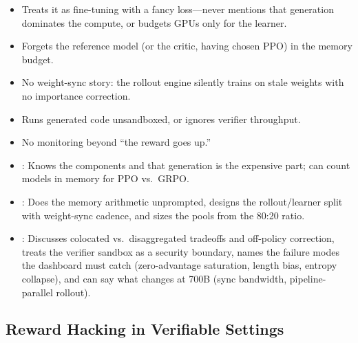 \begin{interviewq}
\redflags
\begin{itemize}
\item Treats it as fine-tuning with a fancy loss---never mentions that
  generation dominates the compute, or budgets GPUs only for the learner.
\item Forgets the reference model (or the critic, having chosen PPO)
  in the memory budget.
\item No weight-sync story: the rollout engine silently trains on stale
  weights with no importance correction.
\item Runs generated code unsandboxed, or ignores verifier throughput.
\item No monitoring beyond ``the reward goes up.''
\end{itemize}


\goodgreat
\begin{itemize}
\item {}: Knows the components and that generation is the
  expensive part; can count models in memory for PPO vs.\ GRPO.
\item {}: Does the memory arithmetic unprompted, designs the
  rollout/learner split with weight-sync cadence, and sizes the pools
  from the 80:20 ratio.
\item {}: Discusses colocated vs.\ disaggregated tradeoffs
  and off-policy correction, treats the verifier sandbox as a security
  boundary, names the failure modes the dashboard must catch
  (zero-advantage saturation, length bias, entropy collapse), and can
  say what changes at 700B (sync bandwidth, pipeline-parallel rollout).
\end{itemize}

\end{interviewq}

\subsection{Reward Hacking in Verifiable Settings}
\label{sec:rlvr_reward_hacking}

